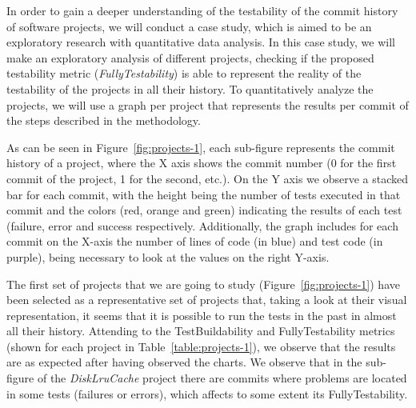 In order to gain a deeper understanding of the testability of the commit history of software projects, we will conduct a case study, which is aimed to be an exploratory research with quantitative data analysis. 
In this case study, we will make an exploratory analysis of different projects, checking if the proposed testability metric (\textit{FullyTestability}) is able to represent the reality of the testability of the projects in all their history.
To quantitatively analyze the projects, we will use a graph per project that represents the results per commit of the steps described in the methodology. 

As can be seen in Figure~\ref{fig:projects-1}, each sub-figure represents the commit history of a project, where the X axis shows the commit number (0 for the first commit of the project, 1 for the second, etc.). On the Y axis we observe a stacked bar for each commit, with the height being the number of tests executed in that commit and the colors (red, orange and green) indicating the results of each test (failure, error and success respectively. Additionally, the graph includes for each commit on the X-axis the number of lines of code (in blue) and test code (in purple), being necessary to look at the values on the right Y-axis.


The first set of projects that we are going to study (Figure~\ref{fig:projects-1}) have been selected as a representative set of projects that, taking a look at their visual representation, it seems that it is possible to run the tests in the past in almost all their history.
Attending to the TestBuildability and FullyTestability metrics (shown for each project in Table~\ref{table:projects-1}), we observe that the results are as expected after having observed the charts.
We observe that in the sub-figure of the \textit{DiskLruCache} project there are commits where problems are located in some tests (failures or errors), which affects to some extent its FullyTestability.

